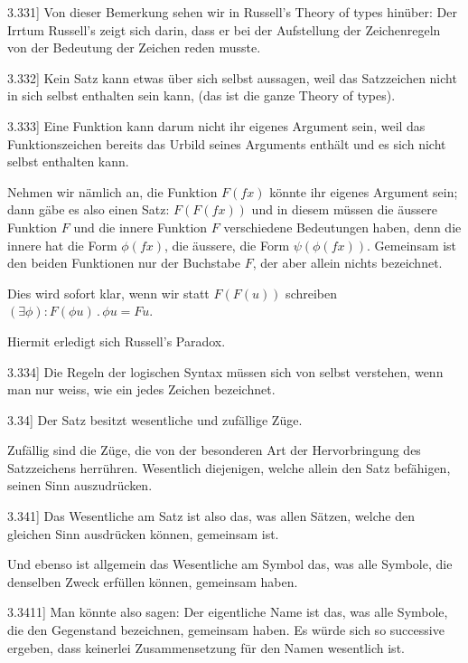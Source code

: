 \documentclass[12pt,oneside]{book}[2007/10/19]
\newcommand{\PropERef}[1]{\hyperref[PropE:#1]{#1}}
\newcommand{\PropositionG}[2]{%
  \item[\phantomsection\label{PropG:#1}\PropERef{#1}] #2%
}
\newcommand{\DotOp}{\mathbin{.}}
\begin{document}
\begin{propositions}
\PropositionG{3.331}
{Von dieser Bemerkung sehen wir in Russell's
\glqq{}Theory of types\grqq{} hinüber: Der Irrtum Russell's
zeigt sich darin, dass er bei der Aufstellung der
Zeichenregeln von der Bedeutung der Zeichen
reden musste.}


\PropositionG{3.332}
{Kein Satz kann etwas über sich selbst aussagen,
weil das Satzzeichen nicht in sich selbst enthalten
sein kann, (das ist die ganze \glqq{}Theory of types\grqq{}).}


\PropositionG{3.333}
{Eine Funktion kann darum nicht ihr eigenes
Argument sein, weil das Funktionszeichen bereits
das Urbild seines Arguments enthält und es sich
nicht selbst enthalten kann.

Nehmen wir nämlich an, die Funktion $F (fx)$
könnte ihr eigenes Argument sein; dann gäbe es
also einen Satz: \glqq{}$F(F(fx))$\grqq{} und in diesem müssen
die äussere Funktion $F$ und die innere Funktion $F$
verschiedene Bedeutungen haben, denn die innere
hat die Form $\phi(fx)$, die äussere, die Form $\psi(\phi(fx))$.
Gemeinsam ist den beiden Funktionen nur der
Buchstabe \glqq{}$F$\grqq{}, der aber allein nichts bezeichnet.

Dies wird sofort klar, wenn wir statt \glqq{}$F(F(u))$\grqq{}
schreiben \glqq{}$(\exists\phi) : F(\phi u) \DotOp \phi u = Fu$\grqq{}.

Hiermit erledigt sich Russell's Paradox.}


\PropositionG{3.334}
{Die Regeln der logischen Syntax müssen sich
von selbst verstehen, wenn man nur weiss, wie
ein jedes Zeichen bezeichnet.}


\PropositionG{3.34}
{Der Satz besitzt wesentliche und zufällige Züge.

Zufällig sind die Züge, die von der besonderen
Art der Hervorbringung des Satzzeichens herrühren.
Wesentlich diejenigen, welche allein den Satz befähigen,
seinen Sinn auszudrücken.}


\PropositionG{3.341}
{Das Wesentliche am Satz ist also das, was allen
Sätzen, welche den gleichen Sinn ausdrücken
können, gemeinsam ist.

Und ebenso ist allgemein das Wesentliche am
Symbol das, was alle Symbole, die denselben
Zweck erfüllen können, gemeinsam haben.}


\PropositionG{3.3411}
{Man könnte also sagen: Der eigentliche Name
ist das, was alle Symbole, die den Gegenstand
bezeichnen, gemeinsam haben. Es würde sich so
successive ergeben, dass keinerlei Zusammensetzung
für den Namen wesentlich ist.}



\end{propositions}
\end{document}
